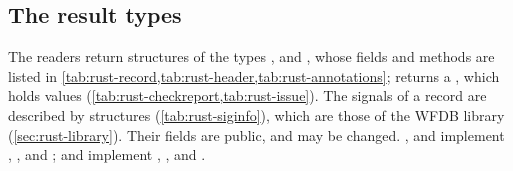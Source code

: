 \subsection{The result types}
\label{sec:rust-results}

The readers return structures of the types ,  and
, whose fields and methods are listed in
\cref{tab:rust-record,tab:rust-header,tab:rust-annotations};  returns
a , which holds  values
(\cref{tab:rust-checkreport,tab:rust-issue}). The signals of a record are described by
 structures (\cref{tab:rust-siginfo}), which are those of the WFDB library
(\cref{sec:rust-library}). Their fields are public, and may be changed. ,
 and  implement , , 
and ;  and  implement ,
,  and .

